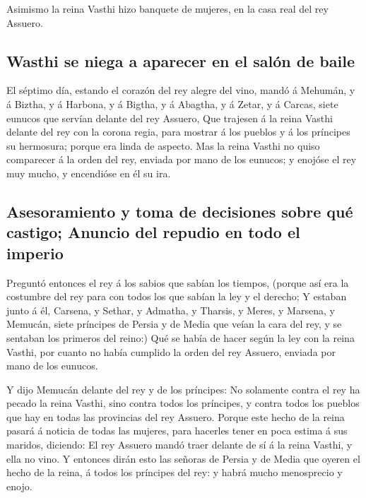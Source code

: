  Asimismo la reina Vasthi hizo banquete de mujeres, en la
casa real del rey Assuero.

\hypertarget{wasthi-se-niega-a-aparecer-en-el-saluxf3n-de-baile}{%
\subsection{Wasthi se niega a aparecer en el salón de
baile}\label{wasthi-se-niega-a-aparecer-en-el-saluxf3n-de-baile}}

 El séptimo día, estando el corazón del rey alegre del
vino, mandó á Mehumán, y á Biztha, y á Harbona, y á Bigtha, y á Abagtha,
y á Zetar, y á Carcas, siete eunucos que servían delante del rey
Assuero,  Que trajesen á la reina Vasthi delante del rey
con la corona regia, para mostrar á los pueblos y á los príncipes su
hermosura; porque era linda de aspecto.  Mas la reina
Vasthi no quiso comparecer á la orden del rey, enviada por mano de los
eunucos; y enojóse el rey muy mucho, y encendióse en él su ira.

\hypertarget{asesoramiento-y-toma-de-decisiones-sobre-quuxe9-castigo-anuncio-del-repudio-en-todo-el-imperio}{%
\subsection{Asesoramiento y toma de decisiones sobre qué castigo;
Anuncio del repudio en todo el
imperio}\label{asesoramiento-y-toma-de-decisiones-sobre-quuxe9-castigo-anuncio-del-repudio-en-todo-el-imperio}}

 Preguntó entonces el rey á los sabios que sabían los
tiempos, (porque así era la costumbre del rey para con todos los que
sabían la ley y el derecho;  Y estaban junto á él,
Carsena, y Sethar, y Admatha, y Tharsis, y Meres, y Marsena, y Memucán,
siete príncipes de Persia y de Media que veían la cara del rey, y se
sentaban los primeros del reino:)  Qué se había de hacer
según la ley con la reina Vasthi, por cuanto no había cumplido la orden
del rey Assuero, enviada por mano de los eunucos.

 Y dijo Memucán delante del rey y de los príncipes: No
solamente contra el rey ha pecado la reina Vasthi, sino contra todos los
príncipes, y contra todos los pueblos que hay en todas las provincias
del rey Assuero.  Porque este hecho de la reina pasará á
noticia de todas las mujeres, para hacerles tener en poca estima á sus
maridos, diciendo: El rey Assuero mandó traer delante de sí á la reina
Vasthi, y ella no vino.  Y entonces dirán esto las
señoras de Persia y de Media que oyeren el hecho de la reina, á todos
los príncipes del rey: y habrá mucho menosprecio y enojo.

